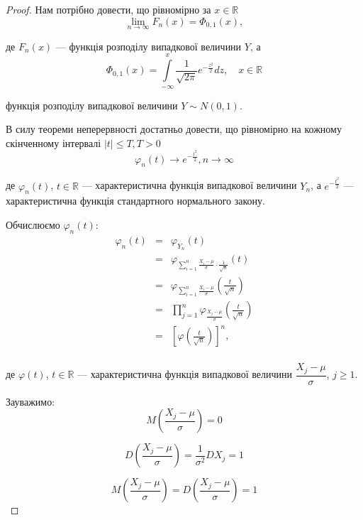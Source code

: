 \begin{proof}
    Нам потрібно довести, що рівномірно за $x \in \mathbb{R}$
    \begin{equation}
        \lim\limits_{n \rightarrow \infty} F_n(x)
        = \Phi_{0, 1}(x),
    \end{equation}

    де $F_n(x)$ --- функція розподілу випадкової величини $Y$, а
    $$\Phi_{0, 1}(x)
    = \int\limits_{-\infty}^{x} \dfrac{1}{\sqrt{2 \pi}} e^{- \frac{z^2}{2}} dz, \quad x \in \mathbb{R} $$

    функція розподілу випадкової величини $Y \sim N(0, 1)$.

    В силу теореми неперервності достатньо довести, що рівномірно
    на кожному скінченному інтервалі $|t| \leqslant T, T > 0$
    \begin{equation}
        \varphi_n(t) \rightarrow e^{-\frac{t^2}{2}}, n \rightarrow \infty
    \end{equation}
    
    де $\varphi_n(t)$, $t \in \mathbb{R}$ --- характеристична функція
    випадкової величини $Y_n$,
    а $e^{-\frac{t^2}{2}}$ --- характеристична функція стандартного нормального
    закону.

    Обчислюємо $\varphi_n(t)$:
    $$\begin{array}{rcl}
        \varphi_n(t) & = & \varphi_{Y_n}(t) \\
        & = & \varphi_{\sum\limits_{i=1}^n \frac{X_i - \mu}{\sigma} \cdot \frac{1}{\sqrt{n}} }(t) \\
        & = & \varphi_{\sum\limits_{i=1}^n \frac{X_i - \mu}{\sigma}}(\frac{t}{\sqrt{n}}) \\
        & = & \prod\limits_{j=1}^n \varphi_{\frac{X_j - \mu}{\sigma}}(\frac{t}{\sqrt{n}}) \\
        & = & \left[ \varphi(\frac{t}{\sqrt{n}}) \right]^n, \\
    \end{array}$$
    
    де $\varphi(t)$, $t \in \mathbb{R}$ --- характеристична функція
    випадкової величини $\dfrac{X_j - \mu}{\sigma}$, $j \geqslant 1$.
    
    Зауважимо:
    $$M\left( \dfrac{X_j - \mu}{\sigma} \right) = 0$$
    
    $$D\left( \dfrac{X_j - \mu}{\sigma} \right)
    = \dfrac{1}{\sigma^2} DX_j
    = 1$$

    $$M\left( \dfrac{X_j - \mu}{\sigma} \right)
    = D\left( \dfrac{X_j - \mu}{\sigma} \right)
    = 1$$
    

\end{proof}
